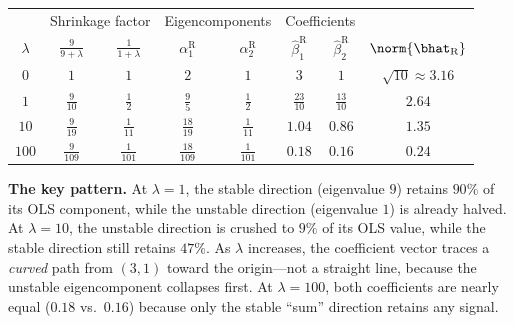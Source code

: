 \begin{example}
\begin{center}
\renewcommand{\arraystretch}{1.4}
\begin{tabular}{c|cc|cc|cc|c}
\toprule
& \multicolumn{2}{c|}{Shrinkage factor}
& \multicolumn{2}{c|}{Eigencomponents}
& \multicolumn{2}{c|}{Coefficients} & \\
$\lambda$
& $\frac{9}{9+\lambda}$ & $\frac{1}{1+\lambda}$
& $\alpha_1^{\text{R}}$ & $\alpha_2^{\text{R}}$
& $\hat\beta_1^{\text{R}}$ & $\hat\beta_2^{\text{R}}$
& $\norm{\bhat_{\text{R}}}$ \\
\midrule
$0$   & $1$ & $1$
      & $2$ & $1$
      & $3$ & $1$
      & $\sqrt{10}\approx 3.16$ \\[2pt]
$1$   & $\frac{9}{10}$ & $\frac{1}{2}$
      & $\frac{9}{5}$ & $\frac{1}{2}$
      & $\frac{23}{10}$ & $\frac{13}{10}$
      & $2.64$ \\[2pt]
$10$  & $\frac{9}{19}$ & $\frac{1}{11}$
      & $\frac{18}{19}$ & $\frac{1}{11}$
      & $1.04$ & $0.86$
      & $1.35$ \\[2pt]
$100$ & $\frac{9}{109}$ & $\frac{1}{101}$
      & $\frac{18}{109}$ & $\frac{1}{101}$
      & $0.18$ & $0.16$
      & $0.24$ \\
\bottomrule
\end{tabular}
\end{center}

\medskip\noindent\textbf{The key pattern.}
At $\lambda=1$, the stable direction (eigenvalue $9$) retains $90\%$ of
its OLS component, while the unstable direction (eigenvalue $1$) is
already halved.
At $\lambda=10$, the unstable direction is crushed to $9\%$ of its OLS
value, while the stable direction still retains $47\%$.
As $\lambda$ increases, the coefficient vector traces a \emph{curved}
path from $(3,1)$ toward the origin---not a straight line, because
the unstable eigencomponent collapses first.
At $\lambda=100$, both coefficients are nearly equal
($0.18$ vs.\ $0.16$) because only the stable ``sum'' direction
retains any signal.
\end{example}



